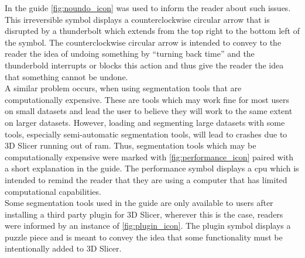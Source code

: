 In the guide \cref{fig:noundo_icon} was used to inform the reader about such issues.
This irreversible symbol displays a counterclockwise circular arrow that is disrupted by a thunderbolt which extends from the top right to the bottom left of the symbol.
The counterclockwise circular arrow is intended to convey to the reader the idea of undoing something by ``turning back time'' and the thunderbold interrupts or blocks this action and thus give the reader the idea that something cannot be undone.\\
A similar problem occurs, when using segmentation tools that are computationally expensive.
These are tools which may work fine for most users on small datasets and lead the user to believe they will work to the same extent on larger datasets.
However, loading and segmenting large datasets with some tools, especially semi-automatic segmentation tools, will lead to crashes due to 3D Slicer running out of \acrfull{ram}.
Thus, segmentation tools which may be computationally expensive were marked with \cref{fig:performance_icon} paired with a short explanation in the guide.
The performance symbol displays a \acrfull{cpu} which is intended to remind the reader that they are using a computer that has limited computational capabilities.\\
Some segmentation tools used in the guide are only available to users after installing a third party plugin for 3D Slicer, wherever this is the case, readers were informed by an instance of \cref{fig:plugin_icon}.
The plugin symbol displays a puzzle piece and is meant to convey the idea that some functionality must be intentionally added to 3D Slicer.
